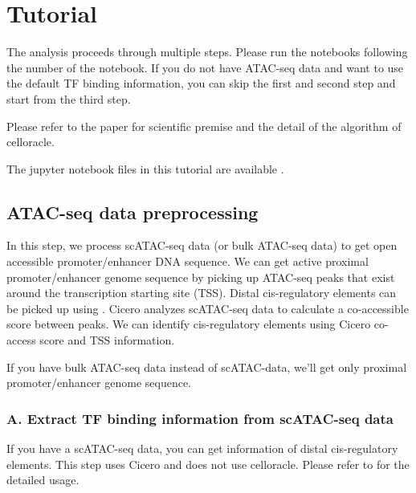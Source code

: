 \documentclass[letterpaper,10pt,english]{sphinxmanual}
\begin{document}
\section{Tutorial}
\label{\detokenize{tutorials/index:tutorial}}\label{\detokenize{tutorials/index:id1}}\label{\detokenize{tutorials/index::doc}}
The analysis proceeds through multiple steps.
Please run the notebooks following the number of the notebook.
If you do not have ATAC-seq data and want to use the default TF binding information, you can skip the first and second step and start from the third step.

Please refer to the  paper for scientific premise and the detail of the algorithm of celloracle.

The jupyter notebook files in this tutorial are available  .


\subsection{ATAC-seq data preprocessing}
\label{\detokenize{tutorials/atac:atac-seq-data-preprocessing}}\label{\detokenize{tutorials/atac:atac}}\label{\detokenize{tutorials/atac::doc}}
In this step, we process scATAC-seq data (or bulk ATAC-seq data) to get open accessible promoter/enhancer DNA sequence.
We can get active proximal promoter/enhancer genome sequence by picking up ATAC-seq peaks that exist around the transcription starting site (TSS).
Distal cis-regulatory elements can be picked up using   .
Cicero analyzes scATAC-seq data to calculate a co-accessible score between peaks.
We can identify cis-regulatory elements using Cicero co-access score and TSS information.

If you have bulk ATAC-seq data instead of scATAC-data, we’ll get only proximal promoter/enhancer genome sequence.


\subsubsection{A. Extract TF binding information from scATAC-seq data}
\label{\detokenize{tutorials/atac:a-extract-tf-binding-information-from-scatac-seq-data}}
If you have a scATAC-seq data, you can get information of distal cis-regulatory elements.
This step uses Cicero and does not use celloracle. Please refer to  for the detailed usage.
\end{document}
